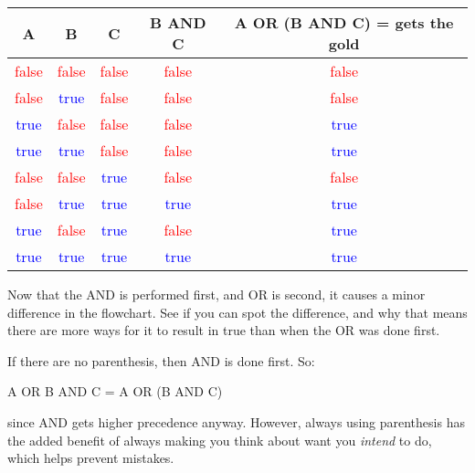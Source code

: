 \begin{center}
	\begin{tabular}{c | c | c | c | c}
		A & B & C & B AND C & A OR (B AND C) = gets the gold\\ \hline
		\textcolor{red}{false} & \textcolor{red}{false} & \textcolor{red}{false} & \textcolor{red}{false} & \textcolor{red}{false}\\ \hline
		\textcolor{red}{false} & \textcolor{blue}{true} & \textcolor{red}{false} & \textcolor{red}{false} & \textcolor{red}{false}\\ \hline
		\textcolor{blue}{true} & \textcolor{red}{false} & \textcolor{red}{false} & \textcolor{red}{false} & \textcolor{blue}{true}\\ \hline
		\textcolor{blue}{true} & \textcolor{blue}{true} & \textcolor{red}{false} & \textcolor{red}{false} & \textcolor{blue}{true}\\ \hline

		\textcolor{red}{false} & \textcolor{red}{false} & \textcolor{blue}{true} & \textcolor{red}{false} & \textcolor{red}{false}\\ \hline
		\textcolor{red}{false} & \textcolor{blue}{true} & \textcolor{blue}{true} & \textcolor{blue}{true} & \textcolor{blue}{true}\\ \hline
		\textcolor{blue}{true} & \textcolor{red}{false} & \textcolor{blue}{true} & \textcolor{red}{false} & \textcolor{blue}{true}\\ \hline
		\textcolor{blue}{true} & \textcolor{blue}{true} & \textcolor{blue}{true} & \textcolor{blue}{true} & \textcolor{blue}{true}\\ \hline
	\end{tabular}
\end{center}

Now that the AND is performed first, and OR is second, it causes a minor difference in the flowchart. See if you can spot the difference, and why that means there are more ways for it to result in true than when the OR was done first.

\begin{center} \end{center}


If there are no parenthesis, then AND is done first. So:

\begin{center}A OR B AND C = A OR (B AND C)\end{center}
	
since AND gets higher precedence anyway. However, always using parenthesis has the added benefit of always making you think about want you \textit{intend} to do, which helps prevent mistakes.

